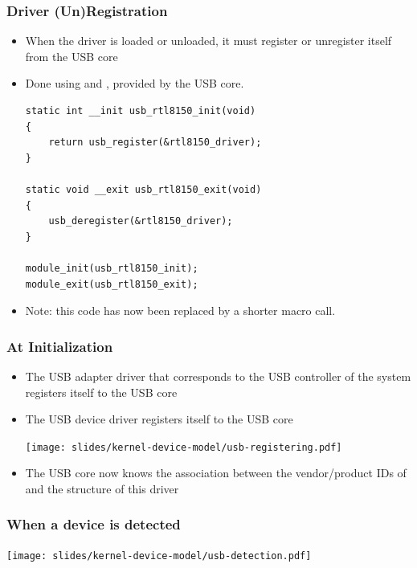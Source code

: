 \begin{frame}[fragile]
  \frametitle{Driver (Un)Registration}
  \begin{itemize}
  \item When the driver is loaded or unloaded, it must register or
    unregister itself from the USB core
  \item Done using  and ,
    provided by the USB core.
    \begin{block}{}
\begin{verbatim}
static int __init usb_rtl8150_init(void)
{
    return usb_register(&rtl8150_driver);
}

static void __exit usb_rtl8150_exit(void)
{
    usb_deregister(&rtl8150_driver);
}

module_init(usb_rtl8150_init);
module_exit(usb_rtl8150_exit);
\end{verbatim}
\end{block}
\item Note: this code has now been replaced by a shorter
   macro call.
  \end{itemize}
\end{frame}

\begin{frame}
  \frametitle{At Initialization}
  \begin{itemize}
  \item The USB adapter driver that corresponds to the USB controller
    of the system registers itself to the USB core
  \item The  USB device driver registers itself to the USB core
    \begin{center}
      \texttt{[image: slides/kernel-device-model/usb-registering.pdf]}
    \end{center}
  \item The USB core now knows the association between the
    vendor/product IDs of  and the  structure
    of this driver
  \end{itemize}
\end{frame}

\begin{frame}
  \frametitle{When a device is detected}
  \begin{center}
    \texttt{[image: slides/kernel-device-model/usb-detection.pdf]}
  \end{center}
\end{frame}


